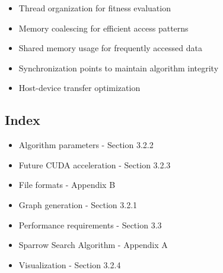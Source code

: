 \documentclass[conference]{IEEEtran}
\begin{document}
\begin{itemize}
    \item Thread organization for fitness evaluation
    \item Memory coalescing for efficient access patterns
    \item Shared memory usage for frequently accessed data
    \item Synchronization points to maintain algorithm integrity
    \item Host-device transfer optimization
\end{itemize}

\subsection{Index}
\begin{itemize}
    \item Algorithm parameters - Section 3.2.2
    \item Future CUDA acceleration - Section 3.2.3
    \item File formats - Appendix B
    \item Graph generation - Section 3.2.1
    \item Performance requirements - Section 3.3
    \item Sparrow Search Algorithm - Appendix A
    \item Visualization - Section 3.2.4
\end{itemize}
\end{document}
